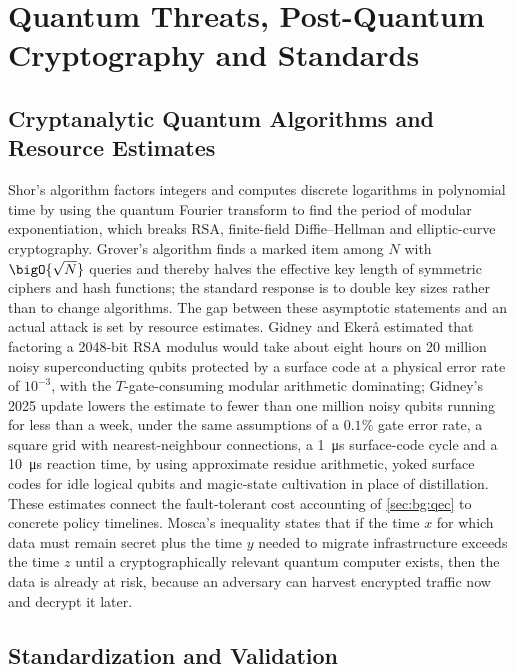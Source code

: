 \section{Quantum Threats, Post-Quantum Cryptography and Standards}\label{sec:bg:crypto}

\subsection{Cryptanalytic Quantum Algorithms and Resource Estimates}

Shor's algorithm \cite{shor1997factoring} factors integers and computes discrete logarithms in polynomial time by using the quantum Fourier transform to find the period of modular exponentiation, which breaks RSA, finite-field Diffie--Hellman and elliptic-curve cryptography. Grover's algorithm \cite{grover1996search} finds a marked item among $N$ with $\bigO{\sqrt{N}}$ queries and thereby halves the effective key length of symmetric ciphers and hash functions; the standard response is to double key sizes rather than to change algorithms. The gap between these asymptotic statements and an actual attack is set by resource estimates. Gidney and Eker{\aa} \cite{gidney2021rsa} estimated that factoring a 2048-bit RSA modulus would take about eight hours on 20 million noisy superconducting qubits protected by a surface code at a physical error rate of $10^{-3}$, with the $T$-gate-consuming modular arithmetic dominating; Gidney's 2025 update \cite{gidney2025million} lowers the estimate to fewer than one million noisy qubits running for less than a week, under the same assumptions of a $0.1\%$ gate error rate, a square grid with nearest-neighbour connections, a \SI{1}{\micro\second} surface-code cycle and a \SI{10}{\micro\second} reaction time, by using approximate residue arithmetic, yoked surface codes for idle logical qubits and magic-state cultivation in place of distillation. These estimates connect the fault-tolerant cost accounting of \cref{sec:bg:qec} to concrete policy timelines. Mosca's inequality \cite{mosca2018cybersecurity} states that if the time $x$ for which data must remain secret plus the time $y$ needed to migrate infrastructure exceeds the time $z$ until a cryptographically relevant quantum computer exists, then the data is already at risk, because an adversary can harvest encrypted traffic now and decrypt it later.

\subsection{Standardization and Validation}

